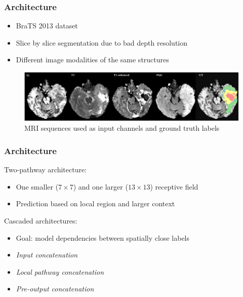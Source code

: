 \documentclass[aspectratio=43, notes]{beamer} 	%
\begin{document}
\begin{frame}
	\frametitle<presentation>{Architecture}
	\begin{itemize}
		\item BraTS 2013 dataset
		\item Slice by slice segmentation due to bad depth resolution
		\item Different image modalities of the same structures
	\end{itemize}
	\begin{figure}[!t]
		\centering
			\includegraphics[width=\textwidth]{bilder/mri_sequences.png}
		\caption{MRI sequences used as input channels and ground truth labels}
		\label{fig:mri_sequences}
	\end{figure}
\end{frame}

\begin{frame}
	\frametitle<presentation>{Architecture}
	\begin{block}{Two-pathway architecture:}
		\begin{itemize}
			\item One smaller ($7 \times 7$) and one larger ($13 \times 13$) receptive field
			\item Prediction based on local region and larger context
		\end{itemize}
	\end{block}
	\begin{block}{Cascaded architectures:}
		\begin{itemize}
			\item Goal: model dependencies between spatially close labels
			\item \emph{Input concatenation}
			\item \emph{Local pathway concatenation}
			\item \emph{Pre-output concatenation}
		\end{itemize} 	
 	\end{block}
\end{frame}
\end{document}
